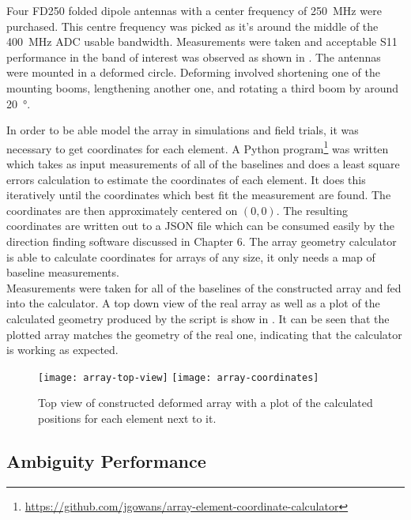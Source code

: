 Four FD250 folded dipole antennas with a center frequency of \SI{250}{\mega\hertz} were purchased. This centre frequency was picked as it's around the middle of the \SI{400}{\mega\hertz} ADC usable bandwidth. Measurements were taken and acceptable S11 performance in the band of interest was observed as shown in .
The antennas were mounted in a deformed circle. Deforming involved shortening one of the mounting booms, lengthening another one, and rotating a third boom by around \SI{20}{\degree}. 

In order to be able model the array in simulations and field trials, it was necessary to get coordinates for each element. A Python program\footnote{\url{https://github.com/jgowans/array-element-coordinate-calculator}} was written which takes as input measurements of all of the baselines and does a least square errors calculation to estimate the coordinates of each element. It does this iteratively until the coordinates which best fit the measurement are found. The coordinates are then approximately centered on \((0,0)\). The resulting coordinates are written out to a JSON file which can be consumed easily by the direction finding software discussed in Chapter 6. The array geometry calculator is able to calculate coordinates for arrays of any size, it only needs a map of baseline measurements.\\

Measurements were taken for all of the baselines of the constructed array and fed into the calculator. A top down view of the real array as well as a plot of the calculated geometry produced by the script is show in . It can be seen that the plotted array matches the geometry of the real one, indicating that the calculator is working as expected.

\begin{figure}
  \texttt{[image: array-top-view]}
  \texttt{[image: array-coordinates]}
  \caption{Top view of constructed deformed array with a plot of the calculated positions for each element next to it.}
  \label{fig:rf-front-end:array-coordinates}
\end{figure}

\subsection{Ambiguity Performance}


